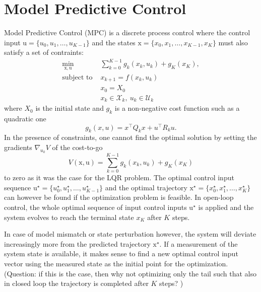 \documentclass[11pt]{report}
\date{\today}
\title{}
\newcommand{\bs}[1]{\boldsymbol{#1}}
\newcommand{\bsu}{\bs{\mathrm{u}}}
\newcommand{\bsx}{\bs{\mathrm{x}}}
\begin{document}
\tableofcontents




\chapter{Model Predictive Control}
\label{sec:MPC}

Model Predictive Control (MPC) is a discrete process control where the control input $\bsu = \{u_0,u_1,\ldots,u_{K-1}\}$ and the states $\bsx = \{x_0,x_1,\ldots,x_{K-1},x_K\}$ must also satisfy a set of contraints:
\begin{equation}
  \label{eq:MPC-general-formulation}
  \begin{aligned}
    \min_{\bsx,\bsu} &\sum_{k=0}^{K-1} g_k(x_k,u_k) + g_K(x_K),\\
    \text{subject to } & x_{k+1} = f(x_k,u_k) \\
                                                       & x_0 = X_0 \\
                                                       & x_k \in \mathcal{X}_k,\ u_k \in \mathcal{U}_k
  \end{aligned}
\end{equation}
where $X_0$ is the initial state and $g_k$ is a non-negative cost function such as a quadratic one
\begin{equation}
  \label{eq:quadratic-stage-cost}
  g_k(x,u) = x^\top Q_k x + u^\top R_k u.
\end{equation}
In the presence of constraints, one cannot find the optimal solution by setting the gradients $\nabla_{u_k} V$ of the cost-to-go
\begin{equation}
  \label{eq:cost-to-go}
  V(\bsx,\bsu) = \sum_{k=0}^{K-1} g_k(x_k,u_k) + g_K(x_K)
\end{equation}
to zero as it was the case for the LQR problem. The optimal control input sequence $\bsu^\star = \{u_0^\star,u_1^\star,\ldots,u_{K-1}^\star\}$ and the optimal trajectory $\bsx^\star = \{x_0^\star,x_1^\star,\ldots,x_K^\star\}$ can however be found if the optimization problem is feasible. In open-loop control, the whole optimal sequence of input control inputs $\bsu^\star$ is applied and the system evolves to reach the terminal state $x_K$ after $K$ steps.

In case of model mismatch or state perturbation however, the system will deviate increasingly more from the predicted trajectory $\bsx^\star$. If a measurement of the system state is available, it makes sense to find a new optimal control input vector using the measured state as the initial point for the optimization. (Question: if this is the case, then why not optimizing only the tail such that also in closed loop the trajectory is completed after $K$ steps? )
\end{document}
